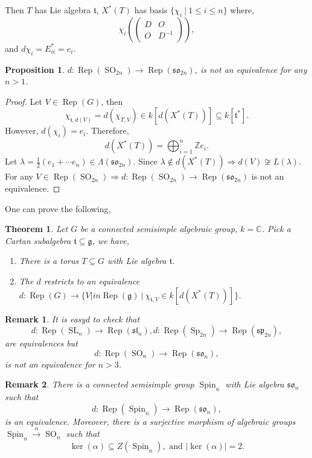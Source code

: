 \documentclass[10pt]{article}
\newtheorem{theorem}{Theorem} [section]
\newtheorem{proposition}{Proposition}[section]
\newtheorem{remark}{Remark}[section]
\numberwithin{equation}{theorem}
\DeclareMathOperator{\SL}{SL}
\DeclareMathOperator{\SO}{SO}
\DeclareMathOperator{\Sp}{Sp}
\DeclareMathOperator{\Spin}{Spin}
\DeclareMathOperator{\Rep}{Rep}
\DeclareMathOperator{\Ker}{ker}
\newcommand{\Z}[0]{\mathbb{Z}}
\newcommand{\C}[0]{\mathbb{C}}
\newcommand{\g}[0]{\mathfrak{g}}
\newcommand{\tl}[0]{\mathfrak{t}}
\newcommand{\spl}[0]{\mathfrak{sl}}
\newcommand{\so}[0]{\mathfrak{so}}
\newcommand{\spg}[0]{\mathfrak{sp}}
\newcommand{\sep}[0]{\:|\:}
\begin{document}
  Then $T$ has Lie algebra $\tl$, $X^*(T)$ has basis $\{\chi_i\sep 1\leq i\leq n\}$ where,
  \begin{equation*}
    \chi_i\left(\begin{pmatrix}
      D & O\\
      O & D^{-1}
    \end{pmatrix}
    \right),
  \end{equation*}
  and $d\chi_i = E_{ii}^* = e_i$.
  \begin{proposition}
    \label{5_34}
    $d:\Rep(\SO_{2n})\to\Rep(\so_{2n})$, is not an equivalence for any $n> 1$. 
  \end{proposition}
  \begin{proof}
    Let $V\in\Rep(G)$, then 
    \begin{equation*}
      \chi_{\tl,d(V)} = d(\chi_{T,V}) \in k[d(X^*(T))]\subseteq k[\tl^*].
    \end{equation*}
    However, $d(\chi_i) = e_i$. Therefore,
    \begin{equation*}
      d(X^*(T)) = \bigoplus_{i=1}^n\Z e_i.
    \end{equation*}
    Let $\lambda = {\frac 1 2}(e_1+\cdots e_n) \in \Lambda(\so_{2n})$. Since $\lambda\not\in d(X^*(T))\Rightarrow d(V)\not\cong L(\lambda)$.
    For any $V\in\Rep(\SO_{2n})\Rightarrow d:\Rep(\SO_{2n})\to\Rep(\so_{2n})$ is not an equivalence.
  \end{proof}
  One can prove the following,
  \begin{theorem}
    \label{theorem_5_35}
    Let $G$ be a connected semisimple algebraic group, $k=\C$. Pick a Cartan subalgebra $\tl\subseteq\g$, we have,
    \begin{enumerate}[1).]
      \item There is a torus $T\subseteq G$ with Lie algebra $\tl$.
      \item The $d$ restricts to an equivalence $d:\Rep(G)\to\{V|in\Rep(\g)\sep \chi_{\tl,V}\in k[d(X^*(T))]\}$.
    \end{enumerate}
  \end{theorem}
  \begin{remark}
    It is easyd to check that 
    \begin{equation*}
      d:\Rep(\SL_n)\to\Rep(\spl_n), d:\Rep(\Sp_{2n})\to\Rep(\spg_{2n}),
    \end{equation*}
    are equivalences but
    \begin{equation*}
      d:\Rep(\SO_{n}) \to\Rep(\so_{n}),
    \end{equation*}
    is not an equivalence for $n>3$.
  \end{remark}
  \begin{remark}
    There is a connected semisimple group $\Spin_n$ with Lie algebra $\so_n$ such that 
  \begin{equation*}
    d:\Rep(\Spin_n)\to\Rep(\so_n),
  \end{equation*}
  is an equivalence. Moreover, there is a surjective morphism of algebraic groups $\Spin_n\stackrel{\alpha}{\to}\SO_n$ such that 
  \begin{equation*}
    \Ker(\alpha)\subseteq Z(\Spin_n),\text{ and } \vert \Ker(\alpha)\vert = 2.
  \end{equation*}
  \end{remark}
\end{document}
